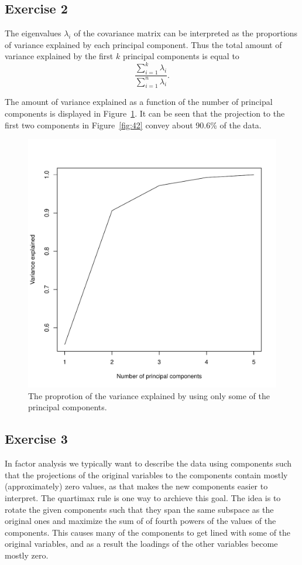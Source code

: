 \documentclass{article}
\begin{document}
\subsection{Exercise 2}
The eigenvalues $\lambda_i$ of the covariance matrix can be interpreted as the proportions of variance explained by each principal component.
Thus the total amount of variance explained by the first $k$ principal components is equal to $$ \frac{\sum_{i=1}^k\lambda_i}{\sum_{i=1}^n\lambda_i}. $$

The amount of variance explained as a function of the number of principal components is displayed in Figure~\ref{fig:varamount}.
It can be seen that the projection to the first two components in Figure~\ref{fig:42} convey about 90.6\% of the data.

\begin{figure}\centering
	\includegraphics[scale=\sscale]{varamount}
	\caption{The proprotion of the variance explained by using only some of the principal components.}\label{fig:varamount}
\end{figure}

\subsection{Exercise 3}
In factor analysis we typically want to describe the data using components such that the projections of the original variables to the components contain mostly (approximately) zero values, as that makes the new components easier to interpret.
The quartimax rule is one way to archieve this goal.
The idea is to rotate the given components such that they span the same subspace as the original ones and maximize the sum of of fourth powers of the values of the components.
This causes many of the components to get lined with some of the original variables, and as a result the loadings of the other variables become mostly zero.
\end{document}
